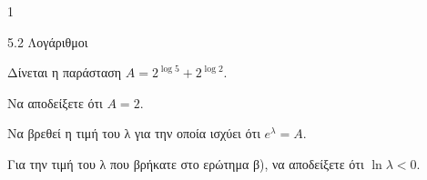\begin{ylh}{1}
\item 5.2 Λογάριθμοι
\end{ylh}
Δίνεται η παράσταση $A = 2^{\log 5} + 2^{\log 2}$.
\begin{alist}
\item Να αποδείξετε ότι $A = 2$.
\item Να βρεθεί η τιμή του λ για την οποία ισχύει ότι $e^\lambda = A$.
\item Για την τιμή του λ που βρήκατε στο ερώτημα β), να αποδείξετε ότι $\ln \lambda < 0$.
\end{alist}

